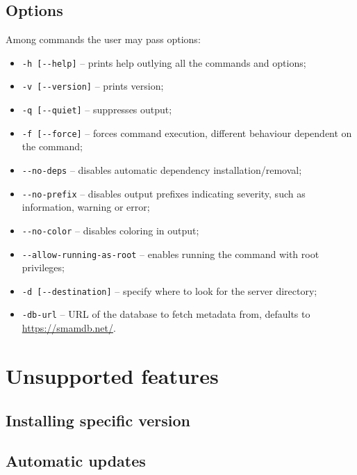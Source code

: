 \subsection{Options}

Among commands the user may pass options:
\begin{itemize}
    \item \verb|-h [--help]| -- prints help outlying all the commands and options;
    \item \verb|-v [--version]| -- prints version;
    \item \verb|-q [--quiet]| -- suppresses output;
    \item \verb|-f [--force]| -- forces command execution, different behaviour dependent on the command;
    \item \verb|--no-deps| -- disables automatic dependency installation/removal;
    \item \verb|--no-prefix| -- disables output prefixes indicating severity, such as information, warning or error;
    \item \verb|--no-color| -- disables coloring in output;
    \item \verb|--allow-running-as-root| -- enables running the command with root privileges;
    \item \verb|-d [--destination]| -- specify where to look for the server directory;
    \item \verb|-db-url| -- URL of the database to fetch metadata from, defaults to \url{https://smamdb.net/}.
\end{itemize}

\section{Unsupported features}

\subsection{Installing specific version}

\subsection{Automatic updates}
